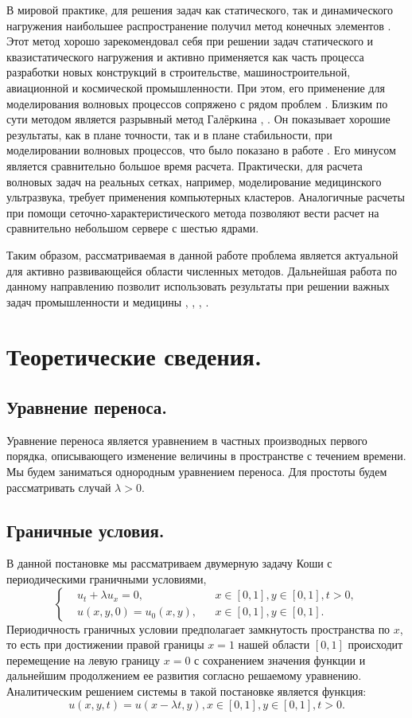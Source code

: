 \documentclass[14pt]{article}
\begin{document}
В мировой практике, для решения задач как статического, так и динамического нагружения наибольшее распространение получил метод конечных элементов \cite{11}. 
Этот метод хорошо зарекомендовал себя при решении задач статического и квазистатического нагружения и активно применяется как часть процесса разработки новых конструкций в строительстве, машиностроительной, авиационной и космической промышленности.
При этом, его применение для моделирования волновых процессов сопряжено с рядом проблем \cite{12}.
Близким по сути методом является разрывный метод Галёркина \cite{13}, \cite{14}.
Он показывает хорошие результаты, как в плане точности, так и в плане стабильности, при моделировании волновых процессов, что было показано в работе \cite{15}.
Его минусом является сравнительно большое время расчета.
Практически, для расчета волновых задач на реальных сетках, например, моделирование медицинского ультразвука, требует применения компьютерных кластеров.
Аналогичные расчеты при помощи сеточно-характеристического метода позволяют вести расчет на сравнительно небольшом сервере с шестью ядрами.

Таким образом, рассматриваемая в данной работе проблема является актуальной для активно развивающейся области численных методов. 
Дальнейшая работа по данному направлению позволит использовать результаты при решении важных задач промышленности и медицины \cite{16}, \cite{17}, \cite{18}, \cite{19}. 

\newpage
\section{Теоретические сведения.}
\subsection{Уравнение переноса.}
Уравнение переноса является уравнением в частных производных первого порядка, описывающего изменение величины в пространстве с течением времени. Мы будем заниматься однородным уравнением переноса. Для простоты будем рассматривать случай $\lambda>0$.
\subsection{Граничные условия.}
В данной постановке мы рассматриваем двумерную задачу Коши с периодическими граничными условиями,
\begin{equation}
 \left\lbrace
  \begin{aligned}
    &u_{t} + \lambda u_{x} = 0,  &&x \in [0,1],y \in [0,1], t>0,\\
    &u(x,y,0) = u_0 (x,y), &&x \in [0,1], y \in [0,1].
  \end{aligned} \right.
\end{equation} 
Периодичность граничных условии предполагает замкнутость  пространства по $x$, то есть при достижении правой границы $x = 1$ нашей области $[0, 1]$ происходит перемещение на левую границу $x = 0$ с сохранением значения функции и дальнейшим продолжением ее развития согласно решаемому уравнению. 
Аналитическим решением системы в такой постановке является функция:
\begin{equation}
u(x,y,t) = u(x-\lambda t,y), x \in [0,1], y \in [0,1], t>0.
\end{equation}
\end{document}

